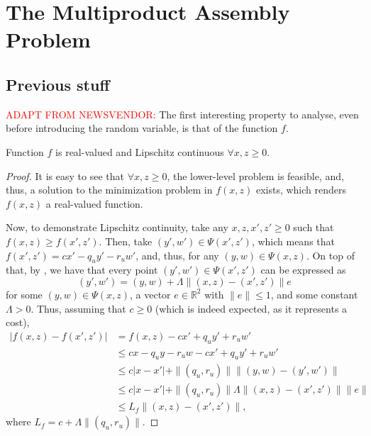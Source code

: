 \documentclass[12pt]{article}
\begin{document}
\section*{The Multiproduct Assembly Problem}


\subsection*{Previous stuff}

\textcolor{red}{ADAPT FROM NEWSVENDOR:}
The first interesting property to analyse, even before introducing the random variable, is that of the function $f$.
\begin{lemma}\label{lemma:f-lip-cont}
    Function $f$ is real-valued and Lipschitz continuous $\forall x,z \ge 0$.
\end{lemma}
\begin{proof}
    It is easy to see that $\forall x,z \ge 0$, the lower-level problem is feasible, and, thus, a solution to the minimization problem in $f(x,z)$ exists, which renders $f(x,z)$ a real-valued function.

    Now, to demonstrate Lipschitz continuity, take any $x,z,x',z' \ge 0$ such that $f(x,z)\ge f(x',z')$.
    Then, take $(y',w') \in \Psi(x',z')$, which means that $f(x',z') = cx' - q_uy' -r_uw'$, and, thus, for any $(y,w) \in \Psi(x,z)$.
    On top of that, by \citet[Theorem~4.2]{klatteErrorBoundsSolutions1995}, we have that every point $(y',w')\in \Psi(x',z')$ can be expressed as \[
	(y',w') = (y,w) + \Lambda \| (x,z)-(x',z') \| e
    \] for some $(y,w) \in \Psi(x,z)$, a vector $e \in \mathbb{R}^{2}$ with $\|e\|\le 1$, and some constant $\Lambda > 0$.
    Thus, assuming that $c\ge 0$ (which is indeed expected, as it represents a cost),
    \begin{align*}
	|f(x,z)-f(x',z')| &= f(x,z) - cx' + q_uy' + r_uw' \\
			  &\le cx - q_u y - r_u w  - cx' + q_uy' + r_uw' \\
			  &\le  c |x-x'| + \|(q_u,r_u)\| \|(y,w)-(y',w')\| \\
			  &\le  c |x-x'| + \|(q_u,r_u)\| \Lambda \| (x,z)-(x',z') \| \|e\| \\
			  &\le  L_f \| (x,z)-(x',z') \|
    ,\end{align*}
    where $L_f = c + \Lambda \|(q_u,r_u)\|$.
\end{proof}
\end{document}
